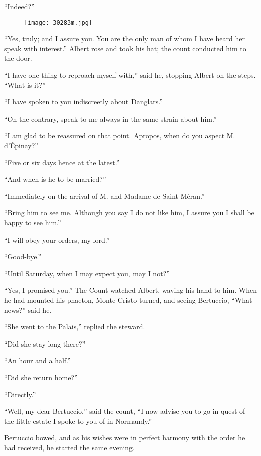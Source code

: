 “Indeed?”

\begin{figure}[ht]
\texttt{[image: 30283m.jpg]}
\end{figure}

“Yes, truly; and I assure you. You are the only man of whom I have
heard her speak with interest.” Albert rose and took his hat; the count
conducted him to the door.

“I have one thing to reproach myself with,” said he, stopping Albert on
the steps. “What is it?”

“I have spoken to you indiscreetly about Danglars.”

“On the contrary, speak to me always in the same strain about him.”

“I am glad to be reassured on that point. Apropos, when do you aspect
M. d’Épinay?”

“Five or six days hence at the latest.”

“And when is he to be married?”

“Immediately on the arrival of M. and Madame de Saint-Méran.”

“Bring him to see me. Although you say I do not like him, I assure you
I shall be happy to see him.”

“I will obey your orders, my lord.”

“Good-bye.”

“Until Saturday, when I may expect you, may I not?”

“Yes, I promised you.” The Count watched Albert, waving his hand to
him. When he had mounted his phaeton, Monte Cristo turned, and seeing
Bertuccio, “What news?” said he.

“She went to the Palais,” replied the steward.

“Did she stay long there?”

“An hour and a half.”

“Did she return home?”

“Directly.”

“Well, my dear Bertuccio,” said the count, “I now advise you to go in
quest of the little estate I spoke to you of in Normandy.”

Bertuccio bowed, and as his wishes were in perfect harmony with the
order he had received, he started the same evening.
